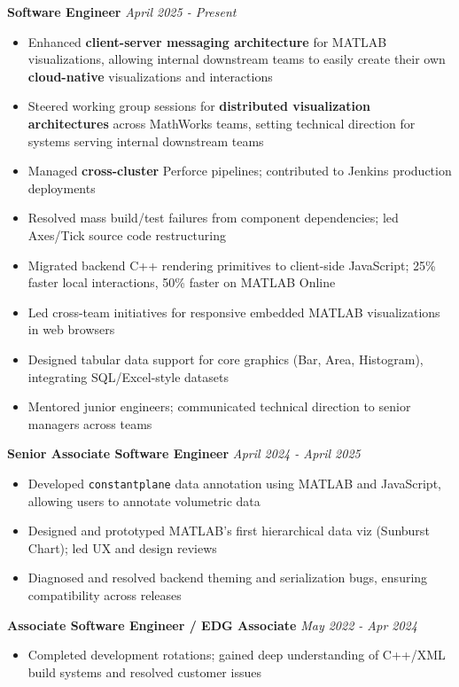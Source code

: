 \documentclass{article}
\begin{document}
{\large \textbf{Software Engineer}} \hfill \textit{April 2025 - Present}
\begin{itemize}[leftmargin=*]
    \item Enhanced \textbf{client-server messaging architecture} for MATLAB visualizations, allowing internal downstream teams to easily create their own \textbf{cloud-native} visualizations and interactions
    \item Steered working group sessions for \textbf{distributed visualization architectures} across MathWorks teams, setting technical direction for systems serving internal downstream teams
    \item Managed \textbf{cross-cluster} Perforce pipelines; contributed to Jenkins production deployments
    \item Resolved mass build/test failures from component dependencies; led Axes/Tick source code restructuring
    \item Migrated backend C++ rendering primitives to client-side JavaScript; 25\% faster local interactions, 50\% faster on MATLAB Online
    \item Led cross-team initiatives for responsive embedded MATLAB visualizations in web browsers
    \item Designed tabular data support for core graphics (Bar, Area, Histogram), integrating SQL/Excel-style datasets
    \item Mentored junior engineers; communicated technical direction to senior managers across teams
\end{itemize}

{\large \textbf{Senior Associate Software Engineer}} \hfill \textit{April 2024 - April 2025}
\begin{itemize}[leftmargin=*]
    \item Developed \texttt{constantplane} data annotation using MATLAB and JavaScript, allowing users to annotate volumetric data
    \item Designed and prototyped MATLAB's first hierarchical data viz (Sunburst Chart); led UX and design reviews
    \item Diagnosed and resolved backend theming and serialization bugs, ensuring compatibility across releases
\end{itemize}

{\large \textbf{Associate Software Engineer / EDG Associate}} \hfill \textit{May 2022 - Apr 2024}
\begin{itemize}[leftmargin=*]
    \item Completed development rotations; gained deep understanding of C++/XML build systems and resolved customer issues
\end{itemize}
\end{document}
